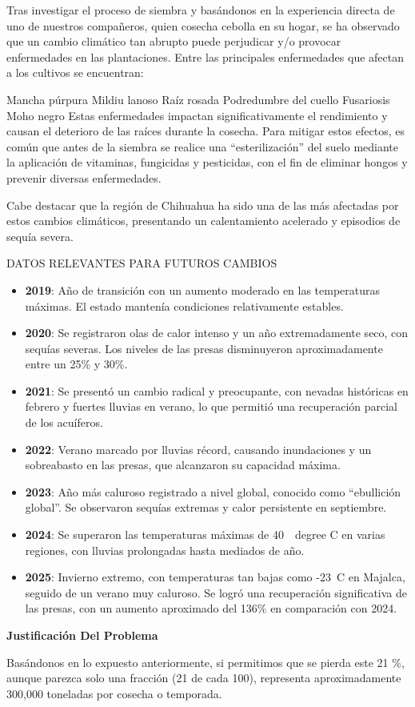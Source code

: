 \documentclass[12pt]{article}
\begin{document}
{{Tras investigar el proceso de siembra y basándonos en la experiencia directa de uno de nuestros compañeros, quien cosecha cebolla en su hogar, se ha observado que un cambio climático tan abrupto puede perjudicar y/o provocar enfermedades en las plantaciones. Entre las principales enfermedades que afectan a los cultivos se encuentran:

Mancha púrpura
Mildiu lanoso
Raíz rosada
Podredumbre del cuello
Fusariosis
Moho negro
Estas enfermedades impactan significativamente el rendimiento y causan el deterioro de las raíces durante la cosecha. Para mitigar estos efectos, es común que antes de la siembra se realice una “esterilización” del suelo mediante la aplicación de vitaminas, fungicidas y pesticidas, con el fin de eliminar hongos y prevenir diversas enfermedades.

Cabe destacar que la región de Chihuahua ha sido una de las más afectadas por estos cambios climáticos, presentando un calentamiento acelerado y episodios de sequía severa.

DATOS RELEVANTES PARA FUTUROS CAMBIOS
\begin{itemize}
	\usepackage{gensymb}
	\item \textbf{2019}: Año de transición con un aumento moderado en las temperaturas máximas. El estado mantenía condiciones relativamente estables.
	\item \textbf{2020}: Se registraron olas de calor intenso y un año extremadamente seco, con sequías severas. Los niveles de las presas disminuyeron aproximadamente entre un 25\% y 30\%.
	\item \textbf{2021}: Se presentó un cambio radical y preocupante, con nevadas históricas en febrero y fuertes lluvias en verano, lo que permitió una recuperación parcial de los acuíferos.
	\item \textbf{2022}: Verano marcado por lluvias récord, causando inundaciones y un sobreabasto en las presas, que alcanzaron su capacidad máxima.
	\item \textbf{2023}: Año más caluroso registrado a nivel global, conocido como “ebullición global”. Se observaron sequías extremas y calor persistente en septiembre.
	\item \textbf{2024}: Se superaron las temperaturas máximas de 40~\ degree C en varias regiones, con lluvias prolongadas hasta mediados de año.
	\item \textbf{2025}: Invierno extremo, con temperaturas tan bajas como -23~\degree C en Majalca, seguido de un verano muy caluroso. Se logró una recuperación significativa de las presas, con un aumento aproximado del 136\% en comparación con 2024.
\end{itemize}
    \newpage
	\begin{center}
		{\huge \textbf{Justificación Del Problema}}
	\end{center}
	\vspace{1cm} 
	{\large %
Basándonos en lo expuesto anteriormente, si permitimos que se pierda este 21 \%, aunque parezca solo una fracción (21 de cada 100), representa aproximadamente 300,000 toneladas por cosecha o temporada.

}}}
\end{document}
